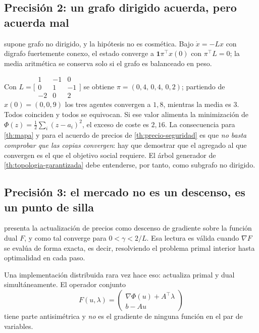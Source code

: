 \subsection{Precisión 2: un grafo dirigido acuerda, pero acuerda mal}

 supone grafo no dirigido, y la hipótesis no es cosmética. Bajo
$\dot x=-Lx$ con digrafo fuertemente conexo, el estado converge a
$\mathbf 1\pi^{\!\top}x(0)$ con $\pi^{\!\top}L=0$; la media aritmética se
conserva solo si el grafo es balanceado en peso.

\begin{observacion}
\label{obs:digrafo}
Con
$L=\bigl[\begin{smallmatrix}1&-1&0\\0&1&-1\\-2&0&2\end{smallmatrix}\bigr]$ se
obtiene $\pi=(0{,}4,\,0{,}4,\,0{,}2)$; partiendo de $x(0)=(0,0,9)$ los tres
agentes convergen a $1{,}8$, mientras la media es $3$. Todos coinciden y todos
se equivocan. Si ese valor alimenta la minimización de
$\Phi(z)=\tfrac12\sum_i(z-a_i)^2$, el exceso de coste es $2{,}16$.
La consecuencia para \cref{th:mapa} y para el acuerdo de precios de
\cref{th:precio-seguridad} es que \emph{no basta comprobar que las copias convergen}: hay que demostrar que el agregado al que convergen es el que el
objetivo social requiere. El árbol generador de \cref{th:topologia-garantizada}
debe entenderse, por tanto, como subgrafo no dirigido.
\end{observacion}

\subsection{Precisión 3: el mercado no es un descenso, es un punto de silla}

 presenta la actualización de precios como descenso de
gradiente sobre la función dual $F$, y como tal converge para
$0<\gamma<2/L$. Esa lectura es válida cuando $\nabla F$ se evalúa de forma
exacta, es decir, resolviendo el problema primal interior hasta optimalidad en
cada paso.

Una implementación distribuida rara vez hace eso: actualiza primal y dual
simultáneamente. El operador conjunto
\begin{equation}
  F(u,\lambda)=
  \begin{pmatrix}\nabla\Phi(u)+A^{\!\top}\lambda\\ b-Au\end{pmatrix}
  \label{eq:operador-silla}
\end{equation}
tiene parte antisimétrica y \emph{no} es el gradiente de ninguna función en el
par de variables.

